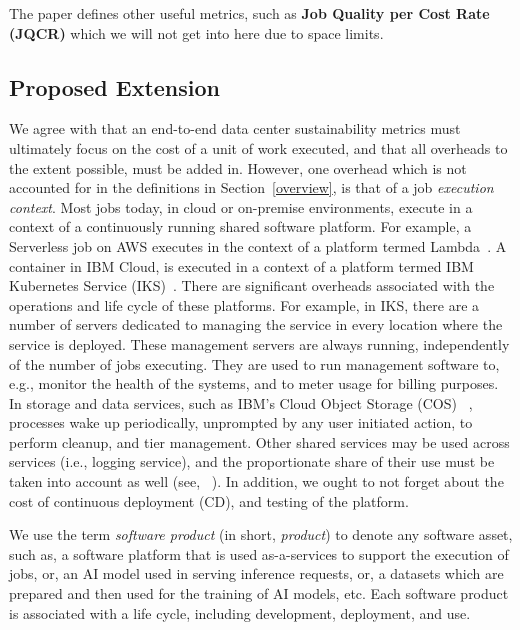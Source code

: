 {{        The paper defines other useful metrics, such as {\bf Job Quality per Cost Rate (JQCR)} which we will not get into here due to space limits. 
    }

    \subsection{Proposed Extension}
    {
        \label{extensions}

        We agree with \cite{Gandhi2022} that an end-to-end data center sustainability metrics must ultimately focus on the cost of a unit of work executed, and that all overheads to the extent possible, must be added in. However, one overhead which is not accounted for in the definitions in Section~\ref{overview}, is that of a job \textit{execution context}. Most jobs today, in cloud or on-premise environments, execute in a context of a continuously running shared software platform. For example, a Serverless job on AWS executes in the context of a platform termed Lambda~\cite{Lambda}. A container in IBM Cloud, is executed in a context of a platform termed IBM Kubernetes Service (IKS)~\cite{IKS}. There are significant overheads associated with the operations and life cycle of these platforms. For example, in IKS, there are a number of servers dedicated to managing the service in every location where the service is deployed. These management servers are always running, independently of the number of jobs executing. They are used to run management software to, e.g., monitor the health of the systems, and to meter usage for billing purposes. In storage and data services, such as IBM's Cloud Object Storage (COS) ~\cite{COS}, processes wake up periodically, unprompted by any user initiated action, to perform cleanup, and tier management. Other shared services may be used across services (i.e., logging service), and the proportionate share of their use must be taken into account as well (see, ~\cite{Eilam2021}). In addition, we ought to not forget about the cost of continuous deployment (CD), and testing of the platform. 

        We use the term \textit{software product} (in short, \textit{product}) to denote any software asset, such as, a software platform that is used as-a-services to support the execution of jobs, or, an AI model used in serving inference requests, or, a datasets which are prepared and then used for the training of AI models, etc. Each software product is associated with a life cycle, including development, deployment, and use. 

}}
